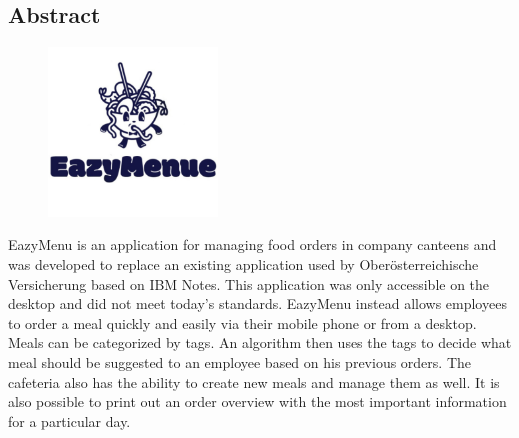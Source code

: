 \begin{spacing}{1}
    \chapter*{Abstract}
\end{spacing}
\begin{figure}
    \begin{center}
      \includegraphics[width=0.4\textwidth]{pics/Logo-EazyMenue.png}
    \end{center}
\end{figure}
EazyMenu is an application for managing food orders in company canteens and was developed to replace an existing application used by Oberösterreichische Versicherung 
based on IBM Notes. 
This application was only accessible on the desktop and did not meet today's standards. 
EazyMenu instead allows employees to order a meal quickly and easily via their mobile phone or from a desktop. 
Meals can be categorized by tags. An algorithm then uses the tags to decide what meal should be suggested to an employee based on his previous orders. 
The cafeteria also has the ability to create new meals and manage them as well. 
It is also possible to print out an order overview with the most important information for a particular day.


\newpage

